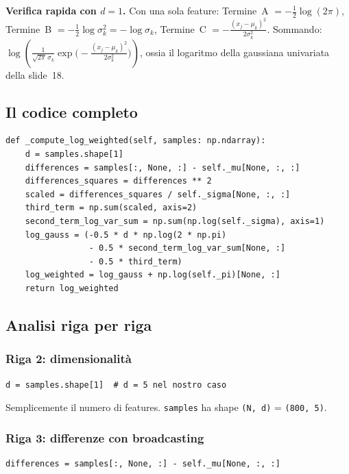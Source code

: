\documentclass[11pt,a4paper]{article}
\begin{document}
\begin{infobox}
\medskip
\textbf{Verifica rapida con $d=1$.}  Con una sola feature: Termine~A $= -\frac{1}{2}\log(2\pi)$,
Termine~B $= -\frac{1}{2}\log\sigma_k^2 = -\log\sigma_k$,
Termine~C $= -\frac{(x_j-\mu_k)^2}{2\sigma_k^2}$.
Sommando: $\log\!\left(\frac{1}{\sqrt{2\pi}\,\sigma_k}
\exp\!\bigl(-\frac{(x_j-\mu_k)^2}{2\sigma_k^2}\bigr)\right)$,
ossia il logaritmo della gaussiana univariata della slide~18.
\end{infobox}

\subsection{Il codice completo}

\begin{lstlisting}[caption={\_compute\_log\_weighted: il cuore del GMM}]
def _compute_log_weighted(self, samples: np.ndarray):
    d = samples.shape[1]
    differences = samples[:, None, :] - self._mu[None, :, :]
    differences_squares = differences ** 2
    scaled = differences_squares / self._sigma[None, :, :]
    third_term = np.sum(scaled, axis=2)
    second_term_log_var_sum = np.sum(np.log(self._sigma), axis=1)
    log_gauss = (-0.5 * d * np.log(2 * np.pi)
                 - 0.5 * second_term_log_var_sum[None, :]
                 - 0.5 * third_term)
    log_weighted = log_gauss + np.log(self._pi)[None, :]
    return log_weighted
\end{lstlisting}

\subsection{Analisi riga per riga}

\subsubsection{Riga 2: dimensionalità}
\begin{lstlisting}
d = samples.shape[1]  # d = 5 nel nostro caso
\end{lstlisting}
Semplicemente il numero di features. \texttt{samples} ha shape \texttt{(N, d)} = \texttt{(800, 5)}.

\subsubsection{Riga 3: differenze con broadcasting}
\begin{lstlisting}
differences = samples[:, None, :] - self._mu[None, :, :]
\end{lstlisting}
\end{document}
